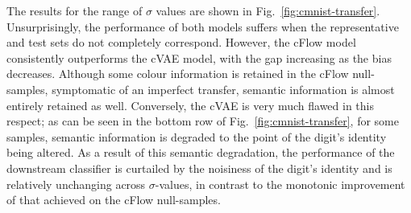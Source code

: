 The results for the range of $\sigma$ values are shown in Fig.~\ref{fig:cmnist-transfer}. Unsurprisingly, the performance of both models suffers when the representative and test sets do not completely correspond. However, the cFlow model consistently outperforms the cVAE model, with the gap increasing as the bias decreases.
Although some colour information is retained in the cFlow null-samples, symptomatic of an imperfect transfer, semantic information is almost entirely retained as well.
Conversely, the cVAE is very much flawed in this respect; as can be seen in the bottom row of Fig.~\ref{fig:cmnist-transfer}, for some samples, semantic information is degraded to the point of the digit's identity being altered. As a result of this semantic degradation, the performance of the downstream classifier is curtailed by the noisiness of the digit's identity and is relatively unchanging across $\sigma$-values, in contrast to the monotonic improvement of that achieved on the cFlow null-samples.

